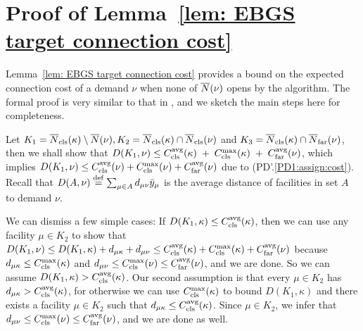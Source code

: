 \documentclass[11pt]{article}
\begin{document}


\pagebreak

\appendix
\section{Proof of Lemma~\ref{lem: EBGS target connection cost}}
  Lemma~\ref{lem: EBGS target connection cost} provides a bound on the
  expected connection cost of a demand $\nu$ when none of
  $\wbarN(\nu)$ opens by the algorithm. The formal proof is very
  similar to that in \cite{ByrkaA10}, and we sketch the main steps
  here for completeness.

  Let $K_1 = \wbarclsnb(\kappa) \setminus \wbarN(\nu), K_2 =
  \wbarclsnb(\kappa) \cap \wbarclsnb(\nu)$ and $K_3 =
  \wbarclsnb(\kappa) \cap \wbarfarnb(\nu)$, then we shall show that
  $D(K_1, \nu) \leq \clsdist(\kappa)\;+\;\clsmax(\kappa)\; + \;
  \fardist(\nu)$, which implies $D(K_1, \nu) \leq \clsdist(\nu) +
  \clsmax(\nu) + \fardist(\nu)$ due to
  (PD'.\ref{PD1:assign:cost}). Recall that $D(A,\nu)
  \stackrel{\mathrm{def}}{=} \sum_{\mu\in A} d_{\mu\nu}\bary_{\mu}$ is
  the average distance of facilities in set $A$ to demand $\nu$.

  We can dismiss a few simple cases: If $D(K_1, \kappa) \leq
  \clsdist(\kappa)$, then we can use any facility $\mu \in K_2$ to
  show that $D(K_1,\nu) \leq D(K_1, \kappa) + d_{\mu\kappa} +
  d_{\mu\nu} \leq \clsdist(\kappa) + \clsmax(\kappa) + \fardist(\nu)$
  because $d_{\mu\kappa} \leq \clsmax(\kappa)$ and $d_{\mu\nu} \leq
  \clsmax(\nu) \leq \fardist(\nu)$, and we are done. So we can assume
  $D(K_1, \kappa) > \clsdist(\kappa)$. Our second assumption is that
  every $\mu \in K_2$ has $d_{\mu\kappa} > \clsdist(\kappa)$, for
  otherwise we can use $\clsmax(\kappa)$ to bound $D(K_1, \kappa)$ and
  there exists a facility $\mu\in K_2$ such that $d_{\mu\kappa} \leq
  \clsdist(\kappa)$. Since $\mu\in K_2$, we infer that $d_{\mu\nu}
  \leq \clsmax(\nu) \leq \fardist(\nu)$, and we are done as well.
\end{document}

